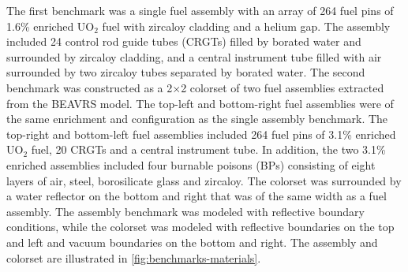 The first benchmark was a single fuel assembly with an array of 264 fuel pins of 1.6\% enriched UO$_2$ fuel with zircaloy cladding and a helium gap. The assembly included 24 control rod guide tubes (CRGTs) filled by borated water and surrounded by zircaloy cladding, and a central instrument tube filled with air surrounded by two zircaloy tubes separated by borated water. The second benchmark was constructed as a 2$\times$2 colorset of two fuel assemblies extracted from the BEAVRS model. The top-left and bottom-right fuel assemblies were of the same enrichment and configuration as the single assembly benchmark. The top-right and bottom-left fuel assemblies included 264 fuel pins of 3.1\% enriched UO$_2$ fuel, 20 CRGTs and a central instrument tube. In addition, the two 3.1\% enriched assemblies included four burnable poisons (BPs) consisting of eight layers of air, steel, borosilicate glass and zircaloy. The colorset was surrounded by a water reflector on the bottom and right that was of the same width as a fuel assembly. The assembly benchmark was modeled with reflective boundary conditions, while the colorset was modeled with reflective boundaries on the top and left and vacuum boundaries on the bottom and right. The assembly and colorset are illustrated in \autoref{fig:benchmarks-materials}.


